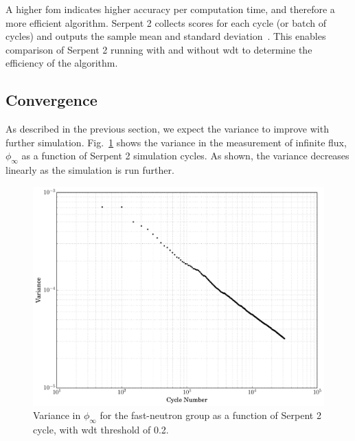  A higher \gls{fom}
indicates higher accuracy per computation time, and therefore a more
efficient algorithm. Serpent 2 collects scores for each cycle (or
batch of cycles) and outputs the sample mean and standard
deviation~\cite{VTT-R-00371-14}. This enables comparison of Serpent 2
running with and without \gls{wdt} to determine the efficiency of the
algorithm.

\subsection{Convergence}
\label{sec:convergence}

As described in the previous section, we expect the variance to
improve with further simulation. Fig.~\ref{fig:error_convergence}
shows the variance in the measurement of infinite flux,
$\phi_{\infty}$ as a function of Serpent 2 simulation cycles. As
shown, the variance decreases linearly as the simulation is run
further.
\begin{figure}[hbtp]
  \centering
  \includegraphics[scale=0.4]{images/error_convergence}
  \caption[Variance in $\phi_{\infty}$ for the fast-neutron group as a
    function of Serpent 2 cycle.]{Variance in $\phi_{\infty}$ for the fast-neutron group as a
    function of Serpent 2 cycle, with \gls{wdt} threshold of 0.2.}
  \label{fig:error_convergence}
\end{figure}

